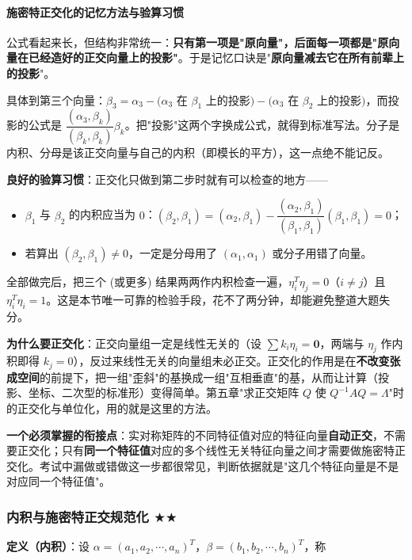 \documentclass[11pt,openany,UTF8]{ctexbook}
\begin{document}
\paragraph{施密特正交化的记忆方法与验算习惯}\mbox{}{\par}

公式看起来长，但结构非常统一：\textbf{只有第一项是"原向量"，后面每一项都是"原向量在已经造好的正交向量上的投影"}。于是记忆口诀是"\textbf{原向量减去它在所有前辈上的投影}"。

具体到第三个向量：$\beta_3=\alpha_3-(\alpha_3$ 在 $\beta_1$ 上的投影$)-(\alpha_3$ 在 $\beta_2$ 上的投影$)$，而投影的公式是 $\dfrac{(\alpha_3,\beta_k)}{(\beta_k,\beta_k)}\beta_k$。把"投影"这两个字换成公式，就得到标准写法。分子是内积、分母是该正交向量与自己的内积（即模长的平方），这一点绝不能记反。

\textbf{良好的验算习惯}：正交化只做到第二步时就有可以检查的地方——

\begin{itemize}
\item $\beta_1$ 与 $\beta_2$ 的内积应当为 $0$：$(\beta_2,\beta_1)=(\alpha_2,\beta_1)-\dfrac{(\alpha_2,\beta_1)}{(\beta_1,\beta_1)}(\beta_1,\beta_1)=0$；
\item 若算出 $(\beta_2,\beta_1)\ne0$，一定是分母用了 $(\alpha_1,\alpha_1)$ 或分子用错了向量。
\end{itemize}
全部做完后，把三个 (或更多) 结果两两作内积检查一遍，$\eta_i^T\eta_j=0$（$i\ne j$）且 $\eta_i^T\eta_i=1$。这是本节唯一可靠的检验手段，花不了两分钟，却能避免整道大题失分。

\textbf{为什么要正交化}：正交向量组一定是线性无关的（设 $\sum k_i\eta_i=\mathbf{0}$，两端与 $\eta_j$ 作内积即得 $k_j=0$），反过来线性无关的向量组未必正交。正交化的作用是在\textbf{不改变张成空间}的前提下，把一组"歪斜"的基换成一组"互相垂直"的基，从而让计算（投影、坐标、二次型的标准形）变得简单。第五章"求正交矩阵 $Q$ 使 $Q^{-1}AQ=\Lambda$"时的正交化与单位化，用的就是这里的方法。

\textbf{一个必须掌握的衔接点}：实对称矩阵的不同特征值对应的特征向量\textbf{自动正交}，不需要正交化；只有\textbf{同一个特征值}对应的多个线性无关特征向量之间才需要做施密特正交化。考试中漏做或错做这一步都很常见，判断依据就是"这几个特征向量是不是对应同一个特征值"。

\subsubsection{内积与施密特正交规范化 $\bigstar$$\bigstar$}

\textbf{定义（内积）}：设 $\alpha=(a_1,a_2,\cdots,a_n)^T$，$\beta=(b_1,b_2,\cdots,b_n)^T$，称
\end{document}

